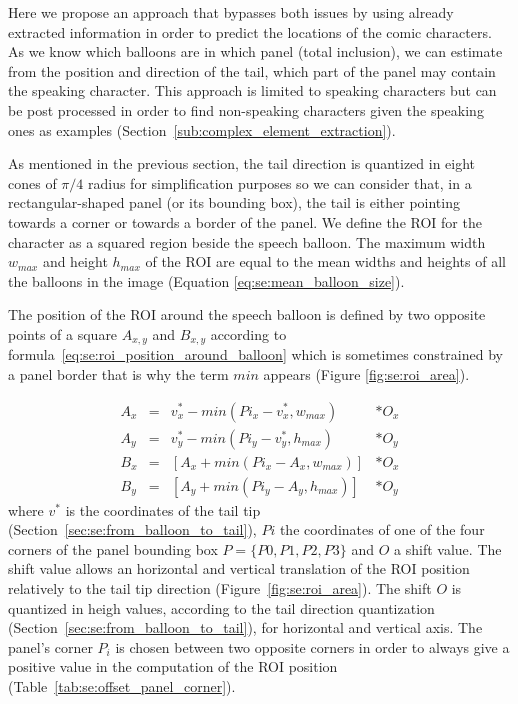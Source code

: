 Here we propose an approach that bypasses both issues by using already extracted information in order to predict the locations of the comic characters.
As we know which balloons are in which panel (total inclusion), we can estimate from the position and direction of the tail, which part of the panel may contain the speaking character.
This approach is limited to speaking characters but can be post processed in order to find non-speaking characters given the speaking ones as examples (Section~\ref{sub:complex_element_extraction}).

As mentioned in the previous section, the tail direction is quantized in eight cones of $\pi/4$ radius for simplification purposes so we can consider that, in a rectangular-shaped panel (or its bounding box), the tail is either pointing towards a corner or towards a border of the panel.
We define the ROI for the character as a squared region beside the speech balloon.
The maximum width $w_{max}$ and height $h_{max}$ of the ROI are equal to the mean widths and heights of all the balloons in the image (Equation \ref{eq:se:mean_balloon_size}).

The position of the ROI around the speech balloon is defined by two opposite points of a square $A_{x,y}$ and $B_{x,y}$ according to formula~\ref{eq:se:roi_position_around_balloon} which is sometimes constrained by a panel border that is why the term $min$ appears (Figure \ref{fig:se:roi_area}).

\begin{equation}
  \label{eq:se:roi_position_around_balloon}
  \begin{array}{rccl} 
	  A_x & = & v^*_x - min(Pi_x - v^*_x, w_{max}) & * O_x \\ 
	  A_y & = & v^*_y - min(Pi_y - v^*_y, h_{max}) & * O_y \\ 
	  B_x & = & \left[ A_x + min(Pi_x - A_x, w_{max}) \right] & * O_x \\ 
	  B_y & = & \left[ A_y + min(Pi_y - A_y, h_{max}) \right] & * O_y
  \end{array} 
\end{equation}
where $v^*$ is the coordinates of the tail tip (Section~\ref{sec:se:from_balloon_to_tail}), $Pi$ the coordinates of one of the four corners of the panel bounding box $P=\{P0, P1, P2, P3\}$ and $O$ a shift value.
The shift value allows an horizontal and vertical translation of the ROI position relatively to the tail tip direction (Figure~\ref{fig:se:roi_area}).
The shift $O$ is quantized in heigh values, according to the tail direction quantization (Section~\ref{sec:se:from_balloon_to_tail}), for horizontal and vertical axis.
The panel's corner $P_i$ is chosen between two opposite corners in order to always give a positive value in the computation of the ROI position (Table~\ref{tab:se:offset_panel_corner}).

